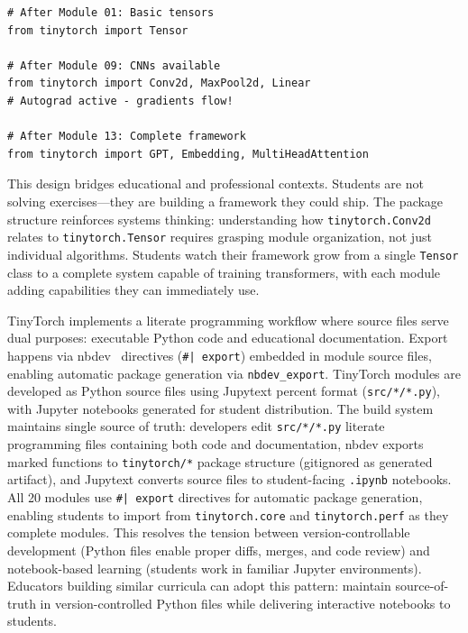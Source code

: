 \documentclass[10pt,twocolumn]{article}
\begin{document}
\begin{lstlisting}[caption={\textbf{Progressive Imports.} Framework capabilities grow module-by-module as students complete implementations.},label={lst:progressive-imports},float=t]
# After Module 01: Basic tensors
from tinytorch import Tensor

# After Module 09: CNNs available
from tinytorch import Conv2d, MaxPool2d, Linear
# Autograd active - gradients flow!

# After Module 13: Complete framework
from tinytorch import GPT, Embedding, MultiHeadAttention
\end{lstlisting}

This design bridges educational and professional contexts. Students are not solving exercises---they are building a framework they could ship. The package structure reinforces systems thinking: understanding how \texttt{tinytorch.Conv2d} relates to \texttt{tinytorch.Tensor} requires grasping module organization, not just individual algorithms. Students watch their framework grow from a single \texttt{Tensor} class to a complete system capable of training transformers, with each module adding capabilities they can immediately use.

TinyTorch implements a literate programming workflow where source files serve dual purposes: executable Python code and educational documentation. Export happens via nbdev~\citep{howard2020} directives (\texttt{\#| export}) embedded in module source files, enabling automatic package generation via \texttt{nbdev\_export}. TinyTorch modules are developed as Python source files using Jupytext percent format (\texttt{src/*/*.py}), with Jupyter notebooks generated for student distribution. The build system maintains single source of truth: developers edit \texttt{src/*/*.py} literate programming files containing both code and documentation, nbdev exports marked functions to \texttt{tinytorch/*} package structure (gitignored as generated artifact), and Jupytext converts source files to student-facing \texttt{.ipynb} notebooks. All 20 modules use \texttt{\#| export} directives for automatic package generation, enabling students to import from \texttt{tinytorch.core} and \texttt{tinytorch.perf} as they complete modules. This resolves the tension between version-controllable development (Python files enable proper diffs, merges, and code review) and notebook-based learning (students work in familiar Jupyter environments). Educators building similar curricula can adopt this pattern: maintain source-of-truth in version-controlled Python files while delivering interactive notebooks to students.
\end{document}
